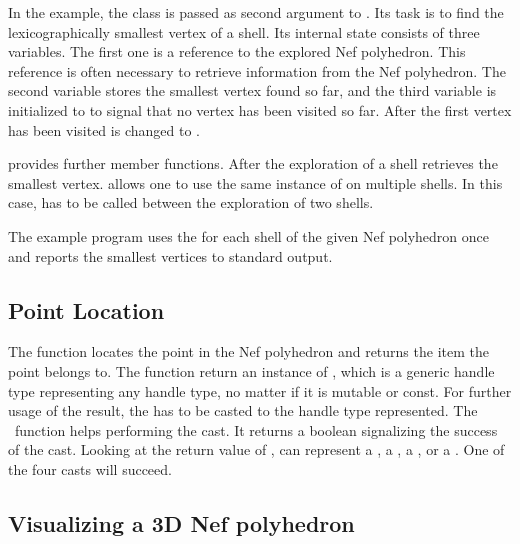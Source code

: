 In the example, the class  is passed as second argument
to . Its task is to find the lexicographically
smallest vertex of a shell. Its internal state consists of three variables. 
The first one is a reference to the explored Nef polyhedron. This reference
is often necessary to retrieve information from the Nef polyhedron. The
second variable  stores the smallest vertex found so far, and
the third variable  is initialized to  to signal that no
vertex has been visited so far. After the first vertex has been visited 
 is changed to .

 provides further member functions. After the exploration
of a shell  retrieves the smallest vertex.  allows one to use the same instance of 
  on multiple shells. In this case, 
has to be called between the exploration of two shells.

The example program uses the  for each shell of the given
Nef polyhedron once and reports the smallest vertices to standard output.

\subsection{Point Location}

The  function locates the point  in the 
Nef polyhedron and returns the item the point belongs to. The function
return an instance of , which is a generic handle
type representing any handle type, no matter if it is mutable or const. 
For further usage of the result, the  has to be casted 
to the handle type represented. The \cgal\ function 
helps performing the cast. It returns a boolean signalizing the success
of the cast. Looking at the return value of , 
 can represent a 
, a , 
a , or a . One of the four
casts will succeed.


\subsection{Visualizing a 3D Nef polyhedron}


